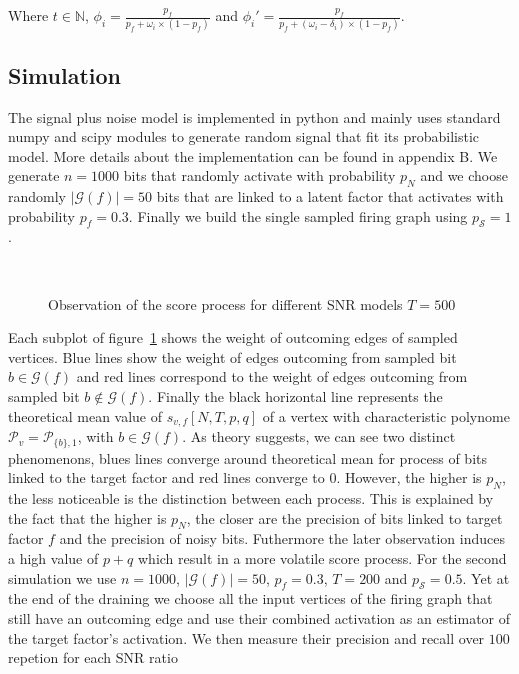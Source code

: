 \documentclass[a4paper, 11pt]{article}
\begin{document}
Where $t \in \mathbb{N}$, $\phi_i = \frac{p_{f}}{p_{f} + \omega_i \times (1 - p_f)}$ and $\phi_i' = \frac{p_{f}}{p_{f} + (\omega_i - \delta_i) \times (1 - p_f)}$.

\subsection{Simulation}

The signal plus noise model is implemented in python and mainly uses standard numpy and scipy modules to generate random signal that fit its probabilistic model. More details about the implementation can be found in appendix B. We generate $n=1000$ bits that randomly activate with probability $p_N$ and we choose randomly $\vert  \mathcal{G}(f)\vert = 50$ bits that are linked to a latent factor that activates with probability $p_f=0.3$. Finally we build the single sampled firing graph using $p_{\mathcal{S}} = 1$.

\begin{figure}[H]
\\
\caption{Observation of the score process for different SNR models $T=500$}
\label{fig:sim_spn_1}
\end{figure}

Each subplot of figure~\ref{fig:sim_spn_1} shows the weight of outcoming edges of sampled vertices. Blue lines show the weight of edges outcoming from sampled bit $b \in \mathcal{G}(f)$ and red lines correspond to the weight of edges outcoming from sampled bit $b \notin \mathcal{G}(f)$. Finally the black horizontal line represents the theoretical mean value of $s_{v, f}[N, T, p, q]$ of a vertex with characteristic polynome $\mathcal{P}_v = \mathcal{P}_{\{b\}, 1}$, with $b \in \mathcal{G}(f)$. As theory suggests, we can see two distinct phenomenons, blues lines converge around theoretical mean for process of bits linked to the target factor and red lines converge to 0. However, the higher is $p_N$,  the less noticeable is the distinction between each process. This is explained by the fact that the higher is $p_N$, the closer are the precision of bits linked to target factor $f$ and the precision of noisy bits. Futhermore the later observation induces a high value of $p+q$ which result in a more volatile score process. For the second simulation we use $n=1000$, $\vert \mathcal{G}(f)\vert = 50$, $p_f=0.3$, $T=200$ and $p_{\mathcal{S}}= 0.5$. Yet at the end of the draining we choose all the input vertices of the firing graph that still have an outcoming edge and use their combined activation as an estimator of the target factor's activation. We then measure their precision and recall over $100$ repetion for each SNR ratio
\end{document}

